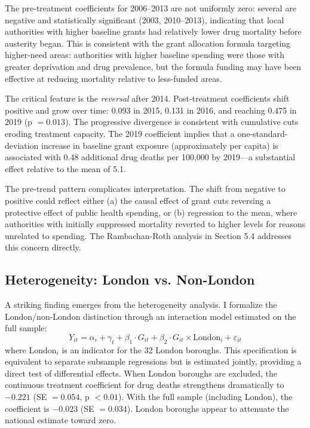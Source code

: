 \documentclass[12pt]{article}
\begin{document}
The pre-treatment coefficients for 2006--2013 are not uniformly zero: several are negative and statistically significant (2003, 2010--2013), indicating that local authorities with higher baseline grants had relatively lower drug mortality before austerity began. This is consistent with the grant allocation formula targeting higher-need areas: authorities with higher baseline spending were those with greater deprivation and drug prevalence, but the formula funding may have been effective at reducing mortality relative to less-funded areas.

The critical feature is the \textit{reversal} after 2014. Post-treatment coefficients shift positive and grow over time: 0.093 in 2015, 0.131 in 2016, and reaching 0.475 in 2019 (p $= 0.013$). The progressive divergence is consistent with cumulative cuts eroding treatment capacity. The 2019 coefficient implies that a one-standard-deviation increase in baseline grant exposure (approximately  per capita) is associated with 0.48 additional drug deaths per 100,000 by 2019---a substantial effect relative to the mean of 5.1.

The pre-trend pattern complicates interpretation. The shift from negative to positive could reflect either (a) the causal effect of grant cuts reversing a protective effect of public health spending, or (b) regression to the mean, where authorities with initially suppressed mortality reverted to higher levels for reasons unrelated to spending. The Rambachan-Roth analysis in Section 5.4 addresses this concern directly.

\subsection{Heterogeneity: London vs. Non-London}

A striking finding emerges from the heterogeneity analysis. I formalize the London/non-London distinction through an interaction model estimated on the full sample:
\begin{equation}
Y_{it} = \alpha_i + \gamma_t + \beta_1 \cdot G_{it} + \beta_2 \cdot G_{it} \times \text{London}_i + \varepsilon_{it}
\end{equation}
where $\text{London}_i$ is an indicator for the 32 London boroughs. This specification is equivalent to separate subsample regressions but is estimated jointly, providing a direct test of differential effects. When London boroughs are excluded, the continuous treatment coefficient for drug deaths strengthens dramatically to $-0.221$ (SE $= 0.054$, p $< 0.01$). With the full sample (including London), the coefficient is $-0.023$ (SE $= 0.034$). London boroughs appear to attenuate the national estimate toward zero.
\end{document}
